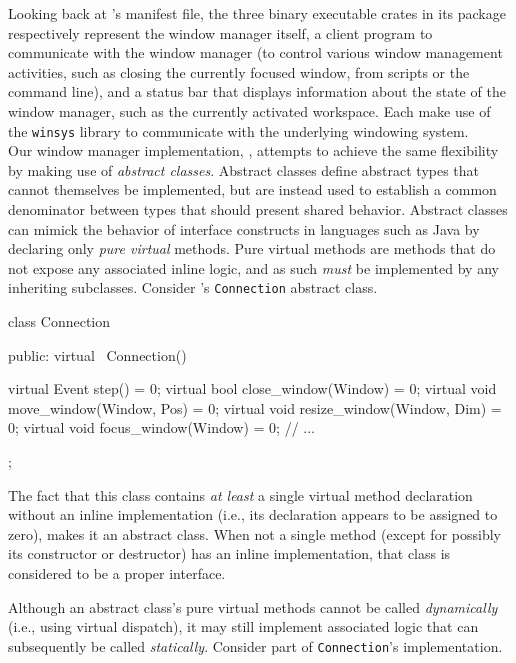Looking back at \wmrs's manifest file, the three binary executable crates in its
package respectively  represent the window  manager itself, a client  program to
communicate  with  the window  manager  (to  control various  window  management
activities, such  as closing the currently  focused window, from scripts  or the
command line), and a status bar that displays information about the state of the
window manager, such as the currently  activated workspace. Each make use of the
\texttt{winsys} library to communicate with the underlying windowing system.\\

Our \cpp  window manager  implementation, \wmcpp, attempts  to achieve  the same
flexibility by making use of  \textit{abstract classes}. Abstract classes define
abstract types  that cannot themselves be  implemented, but are instead  used to
establish  a  common  denominator  between  types  that  should  present  shared
behavior. Abstract  classes can mimick  the behavior of interface  constructs in
languages such  as Java  by declaring only  \textit{pure virtual}  methods. Pure
virtual methods are methods that do  not expose any associated inline logic, and
as  such \textit{must}  be implemented  by any  inheriting subclasses.  Consider
\wmcpp's \texttt{Connection} abstract class.


\begin{cppblock}
  class Connection
  {
  public:
    virtual ~Connection() {}
  
    virtual Event step() = 0;
    virtual bool close_window(Window) = 0;
    virtual void move_window(Window, Pos) = 0;
    virtual void resize_window(Window, Dim) = 0;
    virtual void focus_window(Window) = 0;
    // ...
  };
\end{cppblock}

The fact  that this  class contains  \textit{at least}  a single  virtual method
declaration  without an  inline  implementation (i.e.,  its declaration  appears
to  be  assigned to  zero),  makes  it an  abstract  class.  When not  a  single
method  (except  for possibly  its  constructor  or  destructor) has  an  inline
implementation, that class is considered to be a proper interface.

Although   an  abstract   class's  pure   virtual  methods   cannot  be   called
\textit{dynamically}  (i.e., using  virtual  dispatch), it  may still  implement
associated logic  that can subsequently be  called \textit{statically}. Consider
part of \texttt{Connection}'s implementation.

